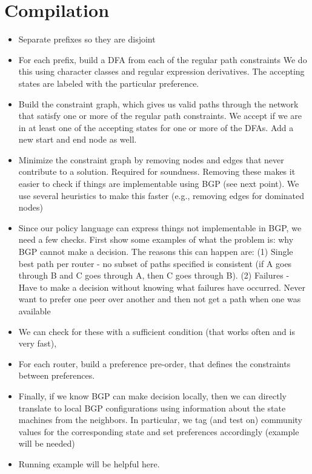 \section{Compilation}
\label{sec:compilation}

\begin{itemize}
	\item Separate prefixes so they are disjoint
	
	\item For each prefix, build a DFA from each of the regular path constraints
		  We do this using character classes and regular expression derivatives.
		  The accepting states are labeled with the particular preference.
	
	\item Build the constraint graph, which gives us valid paths through the network that satisfy one or
		  more of the regular path constraints. We accept if we are in at least one of the accepting states
		  for one or more of the DFAs. Add a new start and end node as well.
		
	\item Minimize the constraint graph by removing nodes and edges that never contribute to a solution.
		  Required for soundness. Removing these makes it easier to check if things are implementable using BGP (see next point).
		  We use several heuristics to make this faster (e.g., removing edges for dominated nodes)
		
	\item Since our policy language can express things not implementable in BGP, we need a few checks.
		  First show some examples of what the problem is: why BGP cannot make a decision.
		  The reasons this can happen are:
		  (1) Single best path per router - no subset of paths specified is consistent (if A goes through B and C goes through A, then C goes through B).
		  (2) Failures - Have to make a decision without knowing what failures have occurred. Never want to prefer one peer over another and then not get a path when one was available

	\item We can check for these with a sufficient condition (that works often and is very fast),

	\item For each router, build a preference pre-order, that defines the constraints between preferences.
	
	\item Finally, if we know BGP can make decision locally, then we can directly translate to local BGP configurations using
		  information about the state machines from the neighbors. In particular, we tag (and test on) community values for the
		  corresponding state and set preferences accordingly (example will be needed)

	\item Running example will be helpful here.	
\end{itemize}


